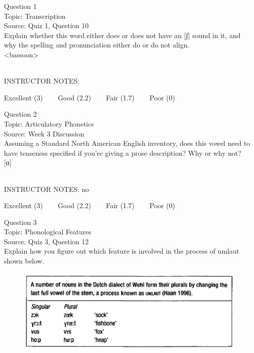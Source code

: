 \documentclass[12pt]{article}
\begin{document}
\begin{center}
\textbf{{\color{blue}{\HUGE START OF EXAM\\}}}

\textbf{{\color{blue}{\HUGE Student ID: 17359\\}}}

\textbf{{\color{blue}{\HUGE \\}}}

\end{center}
\newpage

{\large Question 1}\\

Topic: Transcription\\
Source: Quiz 1, Question 10\\

Explain whether this word either does or does not have an [ʃ] sound in it, and why the spelling and pronunciation either do or do not align.\\

<bassoon>


~\\
INSTRUCTOR NOTES: 


\vfill
Excellent (3) ~~~ Good (2.2) ~~~ Fair (1.7) ~~~ Poor (0)
\newpage

{\large Question 2}\\

Topic: Articulatory Phonetics\\
Source: Week 3 Discussion\\

Assuming a Standard North American English inventory, does this vowel need to have tenseness specified if you're giving a prose description? Why or why not?\\

{[ɑ]}


~\\
INSTRUCTOR NOTES: no


\vfill
Excellent (3) ~~~ Good (2.2) ~~~ Fair (1.7) ~~~ Poor (0)
\newpage

{\large Question 3}\\

Topic: Phonological Features\\
Source: Quiz 3, Question 12\\

Explain how you figure out which feature is involved in the process of umlaut shown below.\\

\begin{figure}[H]
\includegraphics{../images/dutch.png}
\end{figure}
\end{document}
